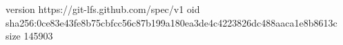 version https://git-lfs.github.com/spec/v1
oid sha256:0ce83e43fe8b75cbfcc56c87b199a180ea3de4c4223826dc488aaca1e8b8613c
size 145903
